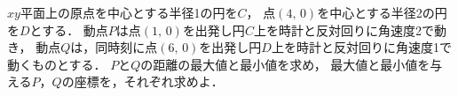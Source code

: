 \documentclass[../../main.tex]{subfiles}
\begin{document}
$xy$平面上の原点を中心とする半径1の円を$C$，
点$(4, \, 0)$を中心とする半径2の円を$D$とする．
動点$P$は点$(1, \, 0)$を出発し円$C$上を時計と反対回りに角速度2で動き，
動点$Q$は，同時刻に点$(6, \, 0)$を出発し円$D$上を時計と反対回りに角速度1で動くものとする．
$P$と$Q$の距離の最大値と最小値を求め，
最大値と最小値を与える$P$，$Q$の座標を，それぞれ求めよ．
\end{document}

